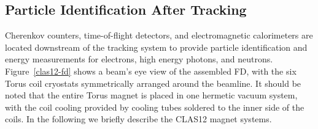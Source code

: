 \documentclass[final,3p,times,twocolumn,authoryear]{elsarticle}
\begin{document}
\subsection{\rm Particle Identification After Tracking}   
Cherenkov counters, time-of-flight detectors,  
and electromagnetic calorimeters are located  downstream of the tracking system to provide particle identification and energy measurements for 
electrons, high energy photons, and neutrons.  Figure~\ref{clas12-fd} shows a beam's eye view of the assembled FD, with the
six Torus coil cryostats symmetrically arranged around the beamline. It should be noted that the entire Torus magnet is 
placed in one hermetic vacuum system, with the coil cooling provided by cooling tubes soldered to the inner side of the coils.  
In the following we briefly describe the CLAS12 magnet systems. 


\end{document}
